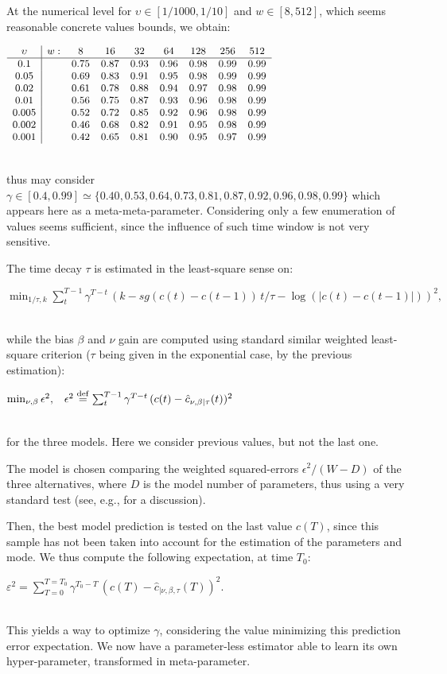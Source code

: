\documentclass{article}
\newcommand{\deq}{\stackrel {\rm def}{=}}
\newcommand{\eqline}[1]{\\\centerline{$#1$}\\}
\begin{document}
At the numerical level for $\upsilon \in [1/1000, 1/10]$ and $w \in [8, 512]$, which seems reasonable concrete values bounds, we obtain:
\eqline{\small \begin{array}{c|cccccccc} \upsilon & w: &8&16&32&64&128&256&512\\ 
  \hline
   0.1&& 0.75& 0.87& 0.93 & 0.96& 0.98& 0.99& 0.99\\ 
  0.05&& 0.69& 0.83& 0.91& 0.95& 0.98& 0.99& 0.99\\ 
  0.02&& 0.61& 0.78& 0.88& 0.94& 0.97& 0.98& 0.99\\ 
  0.01&& 0.56& 0.75& 0.87& 0.93& 0.96& 0.98& 0.99\\ 
 0.005&& 0.52& 0.72& 0.85& 0.92& 0.96& 0.98& 0.99\\ 
 0.002&& 0.46& 0.68& 0.82& 0.91& 0.95& 0.98& 0.99\\ 
 0.001&& 0.42& 0.65& 0.81& 0.90& 0.95& 0.97& 0.99\\
\end {array}}
thus may consider $\gamma \in [0.4, 0.99] \simeq \{0.40,  0.53,  0.64,  0.73, 0.81,  0.87,  0.92,  0.96,  0.98,  0.99\}$ 
which appears here as a meta-meta-parameter. Considering only a few enumeration of values seems sufficient, since the influence of such time window is not very sensitive.

The time decay $\tau$ is estimated in the least-square sense on:
\eqline{\min_{1/\tau, k} \sum_{t}^{T-1} \gamma^{T-t} \, (k - sg(c(t) - c(t-1)) \, t / \tau - \log(|c(t) - c(t-1)|))^2,}
while the bias $\beta$ and $\nu$ gain are computed using standard similar weighted least-square criterion ($\tau$ being given in the exponential case, by the previous estimation):
\eqline{\min_{\nu, \beta} \epsilon^2, \;\;\; \epsilon^2 \deq \sum_{t}^{T-1} \gamma^{T-t} \, (c(t) - \hat{c}_{\nu, \beta|\tau}(t))^2}
for the three models. Here we consider previous values, but not the last one.

The model is chosen comparing the weighted squared-errors $\epsilon^2 / (W - D)$ of the three alternatives, where $D$ is the model number of parameters, thus using a very standard test (see, e.g., \cite{vieville:inria-00000172} for a discussion).

Then, the best model prediction is tested on the last value $c(T)$, since this sample has not been taken into account for the estimation of the parameters and mode. We thus compute the following expectation, at time $T_0$:
\eqline{\varepsilon^2 = \sum_{T=0}^{T=T_0} \gamma^{T_0-T} \,  (c(T) - \hat{c}_{|\nu,\beta,\tau}(T))^2.}
This yields a way to optimize $\gamma$, considering the value minimizing this prediction error expectation. We now have a parameter-less estimator able to learn its own hyper-parameter, transformed in meta-parameter.
\end{document}
